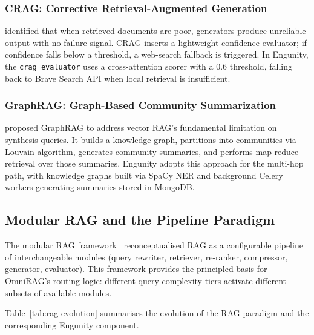 \subsubsection{CRAG: Corrective Retrieval-Augmented Generation}
\citet{yan2024crag} identified that when retrieved documents are poor, generators produce unreliable output with no failure signal. CRAG inserts a lightweight confidence evaluator; if confidence falls below a threshold, a web-search fallback is triggered. In Engunity, the \texttt{crag\_evaluator} uses a cross-attention scorer with a 0.6 threshold, falling back to Brave Search API when local retrieval is insufficient.

\subsubsection{GraphRAG: Graph-Based Community Summarization}
\citet{edge2024local} proposed GraphRAG to address vector RAG's fundamental limitation on synthesis queries. It builds a knowledge graph, partitions into communities via Louvain algorithm, generates community summaries, and performs map-reduce retrieval over those summaries. Engunity adopts this approach for the multi-hop path, with knowledge graphs built via SpaCy NER and background Celery workers generating summaries stored in MongoDB.

\subsection{Modular RAG and the Pipeline Paradigm}
\label{subsec:modular-rag}

The modular RAG framework~\citep{gao2023modularrag} reconceptualised RAG as a configurable pipeline of interchangeable modules (query rewriter, retriever, re-ranker, compressor, generator, evaluator). This framework provides the principled basis for OmniRAG's routing logic: different query complexity tiers activate different subsets of available modules.

Table~\ref{tab:rag-evolution} summarises the evolution of the RAG paradigm and the corresponding Engunity component.

